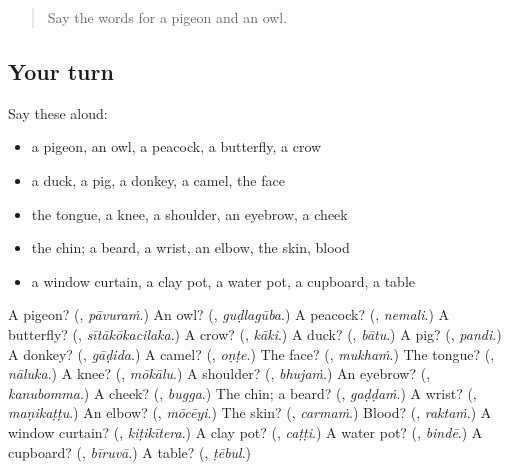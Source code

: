 \label{lesson:TE-R129-second-pass-nature-and-animals}



\begin{quote}
Say the words for a pigeon and an owl.
\end{quote}

\subsection*{Your turn}
Say these aloud:

\begin{itemize}
\raggedright
  \item a pigeon, an owl, a peacock, a butterfly, a crow
  \item a duck, a pig, a donkey, a camel, the face
  \item the tongue, a knee, a shoulder, an eyebrow, a cheek
  \item the chin; a beard, a wrist, an elbow, the skin, blood
  \item a window curtain, a clay pot, a water pot, a cupboard, a table
\end{itemize}

\begin{tcolorbox}[breakable,colback=teal!4,colframe=teal!35!black,title={Before you move on}]
A pigeon? (\textbf{}, \emph{pāvuraṁ}.) An owl? (\textbf{}, \emph{guḍlagūba}.) A peacock? (\textbf{}, \emph{nemali}.) A butterfly? (\textbf{}, \emph{sītākōkacilaka}.) A crow? (\textbf{}, \emph{kāki}.) A duck? (\textbf{}, \emph{bātu}.) A pig? (\textbf{}, \emph{pandi}.) A donkey? (\textbf{}, \emph{gāḍida}.) A camel? (\textbf{}, \emph{oṇṭe}.) The face? (\textbf{}, \emph{mukhaṁ}.) The tongue? (\textbf{}, \emph{nāluka}.) A knee? (\textbf{}, \emph{mōkālu}.) A shoulder? (\textbf{}, \emph{bhujaṁ}.) An eyebrow? (\textbf{}, \emph{kanubomma}.) A cheek? (\textbf{}, \emph{bugga}.) The chin; a beard? (\textbf{}, \emph{gaḍḍaṁ}.) A wrist? (\textbf{}, \emph{maṇikaṭṭu}.) An elbow? (\textbf{}, \emph{mōcēyi}.) The skin? (\textbf{}, \emph{carmaṁ}.) Blood? (\textbf{}, \emph{raktaṁ}.) A window curtain? (\textbf{}, \emph{kiṭikītera}.) A clay pot? (\textbf{}, \emph{caṭṭi}.) A water pot? (\textbf{}, \emph{bindē}.) A cupboard? (\textbf{}, \emph{bīruvā}.) A table? (\textbf{}, \emph{ṭēbul}.)
\end{tcolorbox}
